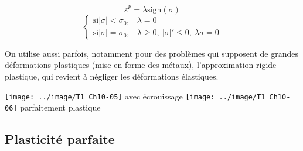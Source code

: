 \begin{equation}
    \dot{\varepsilon}^p = \lambda \text{sign} (\sigma)
    \label{eq:Ch10-007}
\end{equation}
\begin{equation}
    \left\{
    \begin{aligned}
        \text{si} |\sigma| < \sigma_0, & \lambda = 0 \\
        \text{si} |\sigma| = \sigma_0, & \lambda \geq 0, \ |\sigma|' \leq 0, \ \lambda \dot{\sigma} = 0
    \end{aligned}
    \right.
    \label{eq:Ch10-008}
\end{equation}

On utilise aussi parfois, notamment pour des problèmes qui supposent de grandes déformations plastiques (mise en forme des métaux), l'approximation rigide--plastique, qui revient à négliger les déformations élastiques. 
\begin{multicols}{2}
    \centering
    \texttt{[image: ../image/T1\_Ch10-05]}
    avec écrouissage
    \columnbreak
    \texttt{[image: ../image/T1\_Ch10-06]}
    parfaitement plastique
\end{multicols}

\subsection{Plasticité parfaite}
\endinput
Nous nous limiterons désormais à la plasticité parfaite, qui con­
duit à la théorie classique de la plasticité. Cette théorie peut en effet 
être poussée assez loin, et permet d'obtenir de nombreux résultats. 
La définition du seuil de plasticité dans une théorie tridimension­nelle a fait l'objet du § V.3 . De manière générale, le domaine élastique est défini par 
(9) 

où i est la fonction seuil ou fonction de fluage. En plasticité parfaite, le domaine élastique ne change pas, et cette fonction est définie une fois pour toutes. Dans le cas isotrope, on a discuté au § V.3.1 la forme que pre­
nait ce critère pour les métaux 
(10) = 0
i(Â':~ ) i(J~, J 3 ) ~ 
et les deux cri tères les plus utilisés sont le critère de von Mises 
(j,t
Â
(1 1) .h . . A .. , e. 
'1 ...~
2 2> 
et le critère de Tresca (§ V. 3.2) 
( 12) (cr;, -<Tl ) $ (fe ( (f, ~ <rJ, ~ (J3 ) 
Pour les sols, la pression hydrostatique intervient essentielle­ment dans le critère, et on obtient en général de bons résultats en prenant le critère de Coulomb 
[C'i"" " COOIO-: 
(13) 1 T~ 1 < .c. 

